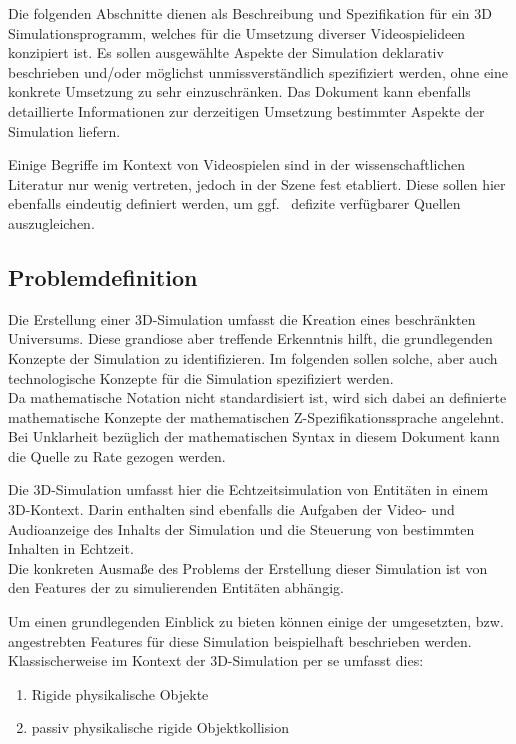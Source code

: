 

Die folgenden Abschnitte dienen als Beschreibung und Spezifikation für ein 3D Simulationsprogramm, welches für die Umsetzung diverser Videospielideen konzipiert ist.
Es sollen ausgewählte Aspekte der Simulation deklarativ beschrieben und/oder möglichst unmissverständlich spezifiziert werden, ohne eine konkrete Umsetzung zu sehr einzuschränken.
Das Dokument kann ebenfalls detaillierte Informationen zur derzeitigen Umsetzung bestimmter Aspekte der Simulation liefern.

Einige Begriffe im Kontext von Videospielen sind in der wissenschaftlichen Literatur nur wenig vertreten, jedoch in der Szene fest etabliert. Diese sollen hier ebenfalls eindeutig definiert werden, um ggf.~ defizite verfügbarer Quellen auszugleichen.

\subsection{Problemdefinition}
Die Erstellung einer 3D-Simulation umfasst die Kreation eines beschränkten Universums. Diese grandiose aber treffende Erkenntnis hilft, die grundlegenden Konzepte der Simulation zu identifizieren. Im folgenden sollen solche, aber auch technologische Konzepte für die Simulation spezifiziert werden.\\
Da mathematische Notation nicht standardisiert ist, wird sich dabei an definierte mathematische Konzepte der mathematischen Z-Spezifikationssprache angelehnt. Bei Unklarheit bezüglich der mathematischen Syntax in diesem Dokument kann die Quelle \cite{Z} zu Rate gezogen werden. 

Die 3D-Simulation umfasst hier die Echtzeitsimulation von Entitäten in einem 3D-Kontext. Darin enthalten sind ebenfalls die Aufgaben der Video- und Audioanzeige des Inhalts der Simulation und die Steuerung von bestimmten Inhalten in Echtzeit.\\
Die konkreten Ausmaße des Problems der Erstellung dieser Simulation ist von den Features der zu simulierenden Entitäten abhängig.

Um einen grundlegenden Einblick zu bieten können einige der umgesetzten, bzw. angestrebten Features für diese Simulation beispielhaft beschrieben werden.\\
Klassischerweise im Kontext der 3D-Simulation per se umfasst dies:
\begin{enumerate}
\item Rigide physikalische Objekte
\item passiv physikalische rigide Objektkollision
\end{enumerate}

